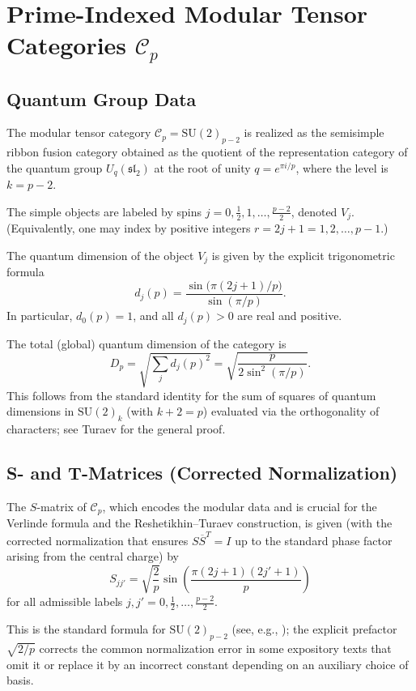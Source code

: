 \section{Prime-Indexed Modular Tensor Categories \(\mathcal{C}_p\)}
\label{sec:mtc}

\subsection{Quantum Group Data}

The modular tensor category \(\mathcal{C}_p = \mathrm{SU}(2)_{p-2}\) is realized as the semisimple ribbon fusion category obtained as the quotient of the representation category of the quantum group \(U_q(\mathfrak{sl}_2)\) at the root of unity \(q = e^{\pi i / p}\), where the level is \(k = p-2\). 

The simple objects are labeled by spins \(j = 0, \frac{1}{2}, 1, \dots, \frac{p-2}{2}\), denoted \(V_j\). (Equivalently, one may index by positive integers \(r = 2j + 1 = 1, 2, \dots, p-1\).) 

The quantum dimension of the object \(V_j\) is given by the explicit trigonometric formula
\[
d_j(p) = \frac{\sin \bigl( \pi (2j + 1)/p \bigr)}{\sin (\pi / p)}.
\]
In particular, \(d_0(p) = 1\), and all \(d_j(p) > 0\) are real and positive. 

The total (global) quantum dimension of the category is
\[
D_p = \sqrt{\sum_{j} d_j(p)^2} = \sqrt{\frac{p}{2 \sin^2(\pi/p)}}.
\]
This follows from the standard identity for the sum of squares of quantum dimensions in \(\mathrm{SU}(2)_k\) (with \(k+2 = p\)) evaluated via the orthogonality of characters; see Turaev \cite{Turaev1994} for the general proof.

\subsection{S- and T-Matrices (Corrected Normalization)}

The \(S\)-matrix of \(\mathcal{C}_p\), which encodes the modular data and is crucial for the Verlinde formula and the Reshetikhin--Turaev construction, is given (with the corrected normalization that ensures \(S \overline{S}^T = I\) up to the standard phase factor arising from the central charge) by
\[
S_{jj'} = \sqrt{\frac{2}{p}} \sin\left( \frac{\pi (2j+1)(2j'+1)}{p} \right)
\]
for all admissible labels \(j, j' = 0, \frac{1}{2}, \dots, \frac{p-2}{2}\). 

This is the standard formula for \(\mathrm{SU}(2)_{p-2}\) (see, e.g., \cite{KirbyMelvin1991, Turaev1994}); the explicit prefactor \(\sqrt{2/p}\) corrects the common normalization error in some expository texts that omit it or replace it by an incorrect constant depending on an auxiliary choice of basis.

